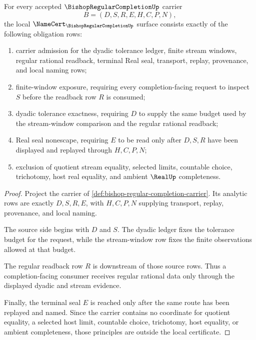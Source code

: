 \begin{theorem}
\label{thm:bishop-regular-completion-namecert-obligations}
For every accepted $\BishopRegularCompletionUp$ carrier
$$
B=(D,S,R,E,H,C,P,N),
$$
the local $\NameCert_{\BishopRegularCompletionUp}$ surface consists exactly of the following obligation rows:
\begin{enumerate}
\item carrier admission for the dyadic tolerance ledger, finite stream windows, regular rational readback, terminal Real seal, transport, replay, provenance, and local naming rows;
\item finite-window exposure, requiring every completion-facing request to inspect $S$ before the readback row $R$ is consumed;
\item dyadic tolerance exactness, requiring $D$ to supply the same budget used by the stream-window comparison and the regular rational readback;
\item Real seal nonescape, requiring $E$ to be read only after $D,S,R$ have been displayed and replayed through $H,C,P,N$;
\item exclusion of quotient stream equality, selected limits, countable choice, trichotomy, host real equality, and ambient $\RealUp$ completeness.
\end{enumerate}
\end{theorem}
\begin{proof}
Project the carrier of \autoref{def:bishop-regular-completion-carrier}. Its analytic rows are exactly $D,S,R,E$, with $H,C,P,N$ supplying transport, replay, provenance, and local naming.

The source side begins with $D$ and $S$. The dyadic ledger fixes the tolerance budget for the request, while the stream-window row fixes the finite observations allowed at that budget.

The regular readback row $R$ is downstream of those source rows. Thus a completion-facing consumer receives regular rational data only through the displayed dyadic and stream evidence.

Finally, the terminal seal $E$ is reached only after the same route has been replayed and named. Since the carrier contains no coordinate for quotient equality, a selected host limit, countable choice, trichotomy, host equality, or ambient completeness, those principles are outside the local certificate.
\end{proof}


